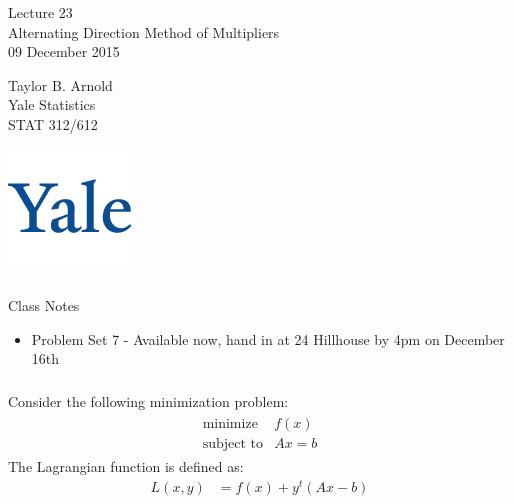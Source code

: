 



\begin{frame}[fragile] \frametitle{}

\vfill

{\fontsize{0.7cm}{0cm}\selectfont Lecture 23 \\\vspace{0.2cm}
Alternating Direction Method of Multipliers}\\\vspace{0.5cm}
09 December 2015

\vspace{2cm}

\begin{minipage}{0.6\textwidth}
Taylor B. Arnold \\
Yale Statistics  \\
STAT 312/612
\end{minipage}
\hfill
\begin{minipage}{0.3\textwidth}\raggedleft
\includegraphics[scale=0.3]{../yale-logo.png}
\end{minipage}%

\end{frame}

\begin{frame}[fragile] \frametitle{}

{\color{yaleblue}\fontsize{16pt}{20pt}\selectfont Class Notes}

\begin{itemize}
\item Problem Set 7 - Available now, hand in at 24 Hillhouse by 4pm on December 16th
\end{itemize}

\end{frame}

\begin{frame}[fragile] \frametitle{}

Consider the following minimization problem:
\begin{align*}
\begin{array}{ll}
\text{minimize} & f(x) \\
\text{subject to} & Ax = b
\end{array}
\end{align*}
\pause The Lagrangian function is defined as:
\begin{align*}
L(x,y) &= f(x) + y^t (Ax - b)
\end{align*}

\end{frame}

